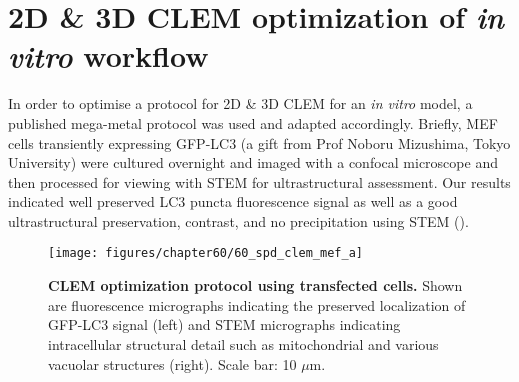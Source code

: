 \section{2D \& 3D CLEM optimization of \textit{in vitro} workflow}
In order to optimise a protocol for 2D \& 3D CLEM for an \textit{in vitro} model, a published mega-metal protocol was used \citep{Russell2017} and adapted accordingly. Briefly, MEF cells transiently expressing GFP-LC3 (a gift from Prof Noboru Mizushima, Tokyo University) were cultured overnight and imaged with a confocal microscope and then processed for viewing with STEM for ultrastructural assessment. Our results indicated well preserved LC3 puncta fluorescence signal as well as a good ultrastructural preservation, contrast, and no precipitation using STEM (). 

\begin{figure}[!htbp]
\centering
 \texttt{[image: figures/chapter60/60\_spd\_clem\_mef\_a]}
 \caption[CLEM optimization protocol using transfected cells]{\textbf{CLEM optimization protocol using transfected cells.} Shown are fluorescence micrographs indicating the preserved localization of GFP-LC3 signal (left) and STEM micrographs indicating intracellular structural detail such as mitochondrial and various vacuolar structures (right). Scale bar: 10 $\mu$m.}
 \label{fig:60_spd_clem_mef_a}
\end{figure} 

